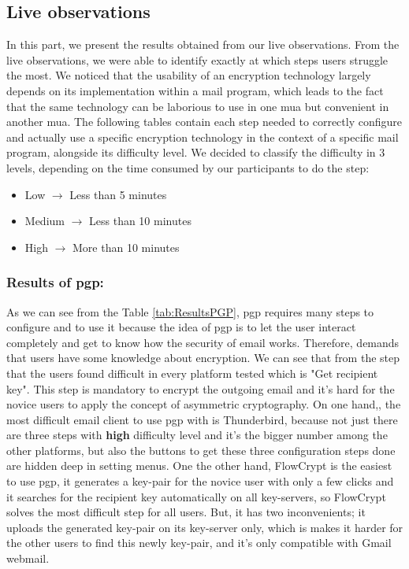 \subsection{Live observations}
In this part, we present the results obtained from our live observations. From the live observations, we were able to identify exactly at which steps users struggle the most. We noticed that the usability of an encryption technology largely depends on its implementation within a mail program, which leads to the fact that the same technology can be laborious to use in one \acrshort{mua} but convenient in another \acrshort{mua}. The following tables contain each step needed to correctly configure and actually use a specific encryption technology in the context of a specific mail program, alongside its difficulty level. We decided to classify the difficulty in 3 levels, depending on the time consumed by our participants to do the step:
\begin{itemize}
	\item Low $\rightarrow$ Less than 5 minutes
	\item Medium $\rightarrow$ Less than 10 minutes
	\item High $\rightarrow$ More than 10 minutes
\end{itemize}

\subsubsection{Results of \acrshort{pgp}:}
As we can see from the Table \ref{tab:ResultsPGP}, \acrshort{pgp} requires many steps to configure and to use it because the idea of \acrshort{pgp} is to let the user interact completely and get to know how the security of email works. Therefore, demands that users have some knowledge about encryption. We can see that from the step that the users found difficult in every platform tested which is "Get recipient key". This step is mandatory to encrypt the outgoing email and it’s hard for the novice users to apply the concept of asymmetric cryptography. On one hand,, the most difficult email client to use \acrshort{pgp} with is Thunderbird, because not just there are three steps with \textbf{high} difficulty level and it's the bigger number among the other platforms, but also the buttons to get these three configuration steps done are hidden deep in setting menus. One the other hand, FlowCrypt is the easiest to use \acrshort{pgp}, it generates a key-pair for the novice user with only a few clicks and it searches for the recipient key automatically on all key-servers, so FlowCrypt solves the most difficult step for all users. But, it has two inconvenients; it uploads the generated key-pair on its key-server only, which is makes it harder for the other users to find this newly key-pair, and it's only compatible with Gmail webmail.

